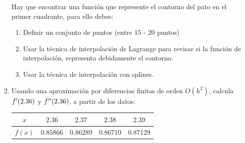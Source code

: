 \begin{enumerate}
\begin{figure}[H]
\end{figure}
Hay que encontrar una función que represente el contorno del pato en el primer cuadrante, para ello debes:
\begin{enumerate}
\item Definir un conjunto de puntos (entre $15$ - $20$ puntos)
\item Usar la técnica de interpolación de Lagrange para revisar si la función de interpolación, representa debidamente el contorno.
\item Usar la técnica de interpolación con splines.
\end{enumerate}
\item Usando una aproximación por diferencias finitas de orden $O(h^{2})$, calcula ${f}^{\prime} (2.36)$ y ${f}^{\prime \prime} (2.36)$, a partir de los datos:
\begin{table}[H]
\centering
\begin{tabular}{c | c | c | c | c}
$x$ & $2.36$ & $2.37$ & $2.38$ & $2.39$ \\ \hline 
$f (x)$ & $0.85866$ & $0.86289$ & $0.86710$ & $0.87129$
\end{tabular}
\end{table}


\end{enumerate}
